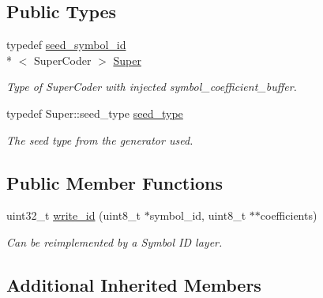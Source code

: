 \subsection*{Public Types}
\begin{DoxyCompactItemize}
\item 
\hypertarget{classkodo_1_1seed__symbol__id__writer_a8d0cde45a34c5e68b2ab7591c08b38b0}{typedef \hyperlink{classkodo_1_1seed__symbol__id}{seed\-\_\-symbol\-\_\-id}\\*
$<$ Super\-Coder $>$ \hyperlink{classkodo_1_1seed__symbol__id__writer_a8d0cde45a34c5e68b2ab7591c08b38b0}{Super}}\label{classkodo_1_1seed__symbol__id__writer_a8d0cde45a34c5e68b2ab7591c08b38b0}

\begin{DoxyCompactList}\small\item\em Type of Super\-Coder with injected symbol\-\_\-coefficient\-\_\-buffer. \end{DoxyCompactList}\item 
\hypertarget{classkodo_1_1seed__symbol__id__writer_a238cd14851a3e066a641fb42c3868de5}{typedef Super\-::seed\-\_\-type \hyperlink{classkodo_1_1seed__symbol__id__writer_a238cd14851a3e066a641fb42c3868de5}{seed\-\_\-type}}\label{classkodo_1_1seed__symbol__id__writer_a238cd14851a3e066a641fb42c3868de5}

\begin{DoxyCompactList}\small\item\em The seed type from the generator used. \end{DoxyCompactList}\end{DoxyCompactItemize}
\subsection*{Public Member Functions}
\begin{DoxyCompactItemize}
\item 
uint32\-\_\-t \hyperlink{classkodo_1_1seed__symbol__id__writer_a0ce0cda388d2455fbc2f2574af7147bb}{write\-\_\-id} (uint8\-\_\-t $\ast$symbol\-\_\-id, uint8\-\_\-t $\ast$$\ast$coefficients)
\begin{DoxyCompactList}\small\item\em Can be reimplemented by a Symbol I\-D layer. \end{DoxyCompactList}\end{DoxyCompactItemize}
\subsection*{Additional Inherited Members}



